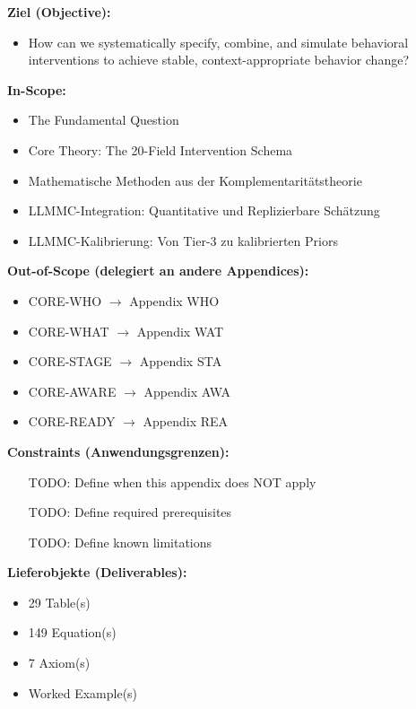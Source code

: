 \begin{tcolorbox}[
    colback=orange!5!white,
    colframe=orange!75!black,
    title={\textbf{Appendix Scope: Ziel / In-Scope / Out-of-Scope / Constraints}},
    fonttitle=\bfseries
]

\textbf{Ziel (Objective):}
\begin{itemize}[nosep]
    \item How can we systematically specify, combine, and simulate behavioral interventions to achieve stable, context-appropriate behavior change?
\end{itemize}

\textbf{In-Scope:}
\begin{itemize}[nosep]
    \item The Fundamental Question
    \item Core Theory: The 20-Field Intervention Schema
    \item Mathematische Methoden aus der Komplementaritätstheorie
    \item LLMMC-Integration: Quantitative und Replizierbare Schätzung
    \item LLMMC-Kalibrierung: Von Tier-3 zu kalibrierten Priors
\end{itemize}

\textbf{Out-of-Scope (delegiert an andere Appendices):}
\begin{itemize}[nosep]
    \item CORE-WHO $\rightarrow$ Appendix WHO
    \item CORE-WHAT $\rightarrow$ Appendix WAT
    \item CORE-STAGE $\rightarrow$ Appendix STA
    \item CORE-AWARE $\rightarrow$ Appendix AWA
    \item CORE-READY $\rightarrow$ Appendix REA
\end{itemize}

\textbf{Constraints (Anwendungsgrenzen):}
\begin{itemize}[nosep]
    \item [TODO: Define when this appendix does NOT apply]
    \item [TODO: Define required prerequisites]
    \item [TODO: Define known limitations]
\end{itemize}

\textbf{Lieferobjekte (Deliverables):}
\begin{itemize}[nosep]
    \item 29 Table(s)
    \item 149 Equation(s)
    \item 7 Axiom(s)
    \item Worked Example(s)
\end{itemize}

\end{tcolorbox}



